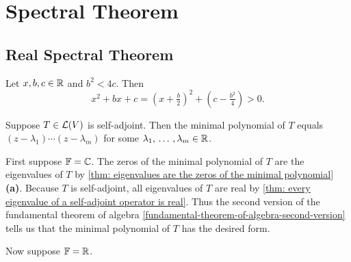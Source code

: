 \section{Spectral Theorem}

\subsection{Real Spectral Theorem}

Let $x, b, c \in \mathbb{R}$ and $b^2 < 4c$. Then
\begin{equation}
  x^2+bx+c = \left(x + \tfrac{b}{2}\right)^2 + \left(c-\tfrac{b^2}{4}\right) > 0.
\end{equation}


\begin{thm}
  Suppose $T \in \mathcal{L}(V)$ is self-adjoint. Then the minimal polynomial of $T$ equals $(z-\lambda_1) \cdots (z-\lambda_m)$ for some $\lambda_1, {\, \ldots \,\,}, \lambda_m \in \mathbb{R}$.
\end{thm}
\begin{prf}
  First suppose $\mathbb{F} = \mathbb{C}$. The zeros of the minimal polynomial of $T$ are the eigenvalues of $T$ by \ref{thm: eigenvalues are the zeros of the minimal polynomial} \textbf{(a)}. Because $T$ is self-adjoint, all eigenvalues of $T$ are real by \ref{thm: every eigenvalue of a self-adjoint operator is real}. Thus the second version of the fundamental theorem of algebra \ref{fundamental-theorem-of-algebra-second-version} tells us that the minimal polynomial of $T$ has the desired form.

  Now suppose $\mathbb{F} = \mathbb{R}$.
\end{prf}